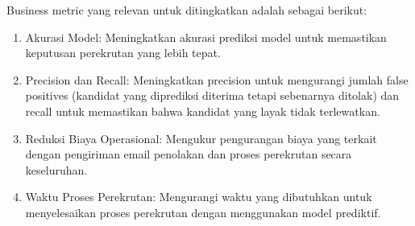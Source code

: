 Business metric yang relevan untuk ditingkatkan adalah sebagai berikut:
\begin{enumerate}
    \item Akurasi Model: Meningkatkan akurasi prediksi model untuk memastikan keputusan perekrutan yang lebih tepat.
    \item Precision dan Recall: Meningkatkan precision untuk mengurangi jumlah false positives (kandidat yang diprediksi diterima tetapi sebenarnya ditolak) dan recall untuk memastikan bahwa kandidat yang layak tidak terlewatkan.
    \item Reduksi Biaya Operasional: Mengukur pengurangan biaya yang terkait dengan pengiriman email penolakan dan proses perekrutan secara keseluruhan.
    \item Waktu Proses Perekrutan: Mengurangi waktu yang dibutuhkan untuk menyelesaikan proses perekrutan dengan menggunakan model prediktif.
\end{enumerate}



